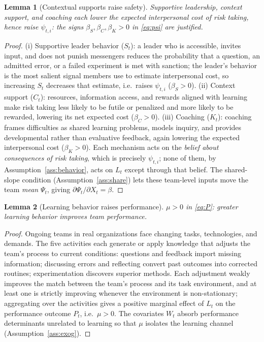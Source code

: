 \documentclass{amsart}
\newtheorem{lemma}{Lemma}
\theoremstyle{definition}
\theoremstyle{remark}
\begin{document}
\begin{lemma}[Contextual supports raise safety]\label{lem:supports}
Supportive leadership, context support, and coaching each lower the
expected interpersonal cost of risk taking, hence raise $\psi_{t,i}$:
the signs $\beta_S,\beta_C,\beta_K>0$ in \eqref{eq:psi} are justified.
\end{lemma}

\begin{proof}
(i) Supportive leader behavior ($S_t$): a leader who is accessible,
invites input, and does not punish messengers reduces the probability that
a question, an admitted error, or a failed experiment is met with
sanction; the leader's behavior is the most salient signal members use to
estimate interpersonal cost, so increasing $S_t$ decreases that estimate,
i.e.\ raises $\psi_{t,i}$ ($\beta_S>0$). (ii) Context support ($C_t$):
resources, information access, and rewards aligned with learning make risk
taking less likely to be futile or penalized and more likely to be
rewarded, lowering its net expected cost ($\beta_C>0$). (iii) Coaching
($K_t$): coaching frames difficulties as shared learning problems, models
inquiry, and provides developmental rather than evaluative feedback, again
lowering the expected interpersonal cost ($\beta_K>0$). Each mechanism acts
on the \emph{belief about consequences of risk taking}, which is precisely
$\psi_{t,i}$; none of them, by Assumption~\ref{ass:behavior}, acts on
$L_t$ except through that belief. The shared-slope condition
(Assumption~\ref{ass:share}) lets these team-level inputs move the team
\emph{mean} $\Psi_t$, giving $\partial \Psi_t/\partial X_t=\beta$.
\end{proof}

\begin{lemma}[Learning behavior raises performance]\label{lem:perf}
$\mu>0$ in \eqref{eq:P}: greater learning behavior improves team
performance.
\end{lemma}

\begin{proof}
Ongoing teams in real organizations face changing tasks, technologies, and
demands. The five activities each generate or apply knowledge that adjusts
the team's process to current conditions: questions and feedback import
missing information; discussing errors and reflecting convert past
outcomes into corrected routines; experimentation discovers superior
methods. Each adjustment weakly improves the match between the team's
process and its task environment, and at least one is strictly improving
whenever the environment is non-stationary; aggregating over the
activities gives a positive marginal effect of $L_t$ on the performance
outcome $P_t$, i.e.\ $\mu>0$. The covariates $W_t$ absorb performance
determinants unrelated to learning so that $\mu$ isolates the
learning channel (Assumption~\ref{ass:exog}).
\end{proof}
\end{document}
